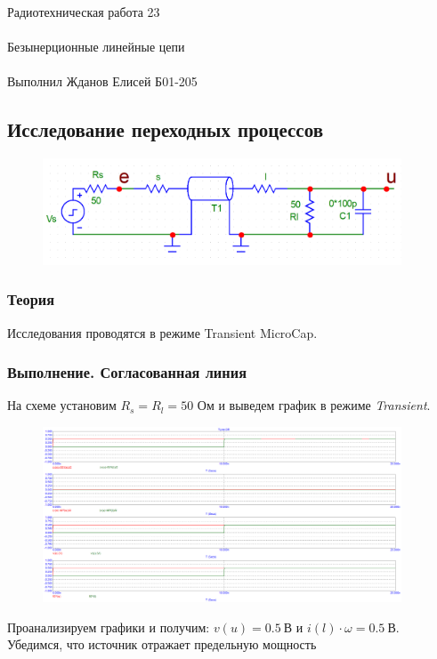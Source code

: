 \documentclass{astroedu-lab}
\begin{document}
\begin{problem}{\huge Радиотехническая работа 23\\\\Безынерционные линейные цепи\\\\Выполнил Жданов Елисей Б01-205}
\subsection{Исследование переходных процессов}

\begin{figure}[!h]
	\centering
	\includegraphics[width=0.95\textwidth]{модель.png}
	\label{fig:boiler}
\end{figure}

\subsubsection{Теория}

Исследования проводятся в режиме Transient MicroCap.

\subsubsection{Выполнение. Согласованная линия}

На схеме установим $R_s = R_l = 50$ Ом и выведем график в режиме \textit{Transient}.

\begin{figure}[h!]
\centering
\includegraphics[width=0.95\textwidth]{картинки/Graph1.png}
\label{fig:Image1}
\end{figure}

Проанализируем графики и получим: $v(u) = 0.5 \: \textit{В}$ и $i(l)\cdot \omega = 0.5 \: \textit{В}$. Убедимся, что источник отражает предельную мощность


\end{problem}
\end{document}

